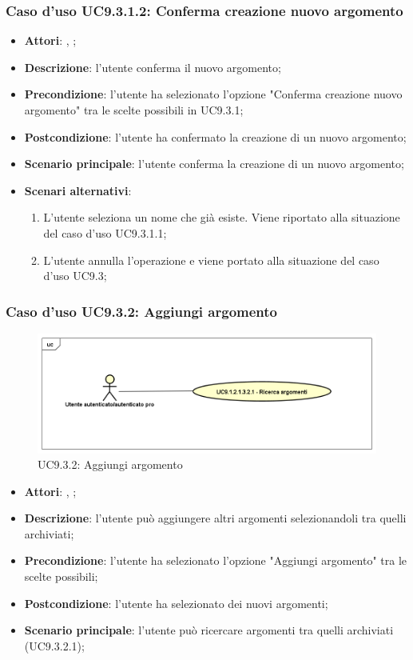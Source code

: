 		 \subsubsection{Caso d'uso UC9.3.1.2: Conferma creazione nuovo argomento}
		 \label{UC9.3.1.2}
		 \begin{itemize}
		 	\item \textbf{Attori}: \uau, \uaupro;
		 	\item \textbf{Descrizione}: l'utente conferma il nuovo argomento;
		 	\item \textbf{Precondizione}: l'utente ha selezionato l'opzione "Conferma creazione nuovo argomento" tra le scelte possibili in UC9.3.1;
		 	\item \textbf{Postcondizione}: l'utente ha confermato la creazione di un nuovo argomento;
		 	\item \textbf{Scenario principale}: l'utente conferma la creazione di un nuovo argomento;
		 	\item \textbf{Scenari alternativi}: 
		 	\begin{enumerate}
		 		\item L'utente seleziona un nome che già esiste. Viene riportato alla situazione del caso d'uso UC9.3.1.1;
		 		\item L'utente annulla l'operazione e viene portato alla situazione del caso d'uso UC9.3;
		 	\end{enumerate}
		 	
		 \end{itemize}
		 
		 \subsubsection{Caso d'uso UC9.3.2: Aggiungi argomento}
		 \label{UC9.3.2}
		 \begin{figure}[h]
		 	\centering
		 	\includegraphics[scale=0.5,keepaspectratio]{UML/UC9_1_2_1_3_2.png}
		 	\caption{UC9.3.2: Aggiungi argomento}
		 \end{figure}
		 \FloatBarrier
		 \begin{itemize}
		 	\item \textbf{Attori}: \uau, \uaupro;
		 	\item \textbf{Descrizione}: l'utente può aggiungere altri argomenti selezionandoli tra quelli archiviati;  
		 	\item \textbf{Precondizione}: l'utente ha selezionato l'opzione "Aggiungi argomento" tra le scelte possibili;
		 	\item \textbf{Postcondizione}: l'utente ha selezionato dei nuovi argomenti;
		 	\item \textbf{Scenario principale}: l'utente può ricercare argomenti tra quelli archiviati (UC9.3.2.1);
		 \end{itemize}
		 
